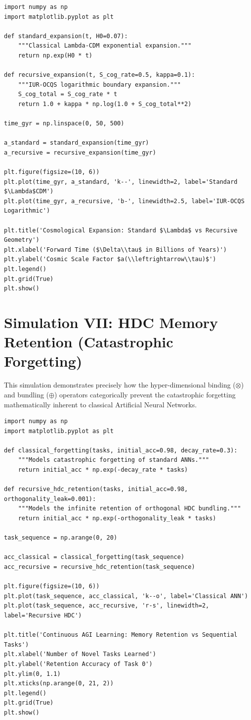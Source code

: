 \documentclass[12pt,openany]{book}
\begin{document}
\begin{verbatim}
import numpy as np
import matplotlib.pyplot as plt

def standard_expansion(t, H0=0.07):
    """Classical Lambda-CDM exponential expansion."""
    return np.exp(H0 * t)

def recursive_expansion(t, S_cog_rate=0.5, kappa=0.1):
    """IUR-OCQS logarithmic boundary expansion."""
    S_cog_total = S_cog_rate * t
    return 1.0 + kappa * np.log(1.0 + S_cog_total**2)

time_gyr = np.linspace(0, 50, 500) 

a_standard = standard_expansion(time_gyr)
a_recursive = recursive_expansion(time_gyr)

plt.figure(figsize=(10, 6))
plt.plot(time_gyr, a_standard, 'k--', linewidth=2, label='Standard $\Lambda$CDM')
plt.plot(time_gyr, a_recursive, 'b-', linewidth=2.5, label='IUR-OCQS Logarithmic')

plt.title('Cosmological Expansion: Standard $\Lambda$ vs Recursive Geometry')
plt.xlabel('Forward Time ($\Delta\\tau$ in Billions of Years)')
plt.ylabel('Cosmic Scale Factor $a(\\leftrightarrow\\tau)$')
plt.legend()
plt.grid(True)
plt.show()
\end{verbatim}

\section{Simulation VII: HDC Memory Retention (Catastrophic Forgetting)}
This simulation demonstrates precisely how the hyper-dimensional binding ($\otimes$) and bundling ($\oplus$) operators categorically prevent the catastrophic forgetting mathematically inherent to classical Artificial Neural Networks.

\begin{verbatim}
import numpy as np
import matplotlib.pyplot as plt

def classical_forgetting(tasks, initial_acc=0.98, decay_rate=0.3):
    """Models catastrophic forgetting of standard ANNs."""
    return initial_acc * np.exp(-decay_rate * tasks)

def recursive_hdc_retention(tasks, initial_acc=0.98, orthogonality_leak=0.001):
    """Models the infinite retention of orthogonal HDC bundling."""
    return initial_acc * np.exp(-orthogonality_leak * tasks)

task_sequence = np.arange(0, 20) 

acc_classical = classical_forgetting(task_sequence)
acc_recursive = recursive_hdc_retention(task_sequence)

plt.figure(figsize=(10, 6))
plt.plot(task_sequence, acc_classical, 'k--o', label='Classical ANN')
plt.plot(task_sequence, acc_recursive, 'r-s', linewidth=2, label='Recursive HDC')

plt.title('Continuous AGI Learning: Memory Retention vs Sequential Tasks')
plt.xlabel('Number of Novel Tasks Learned')
plt.ylabel('Retention Accuracy of Task 0')
plt.ylim(0, 1.1)
plt.xticks(np.arange(0, 21, 2))
plt.legend()
plt.grid(True)
plt.show()
\end{verbatim}
\end{document}

